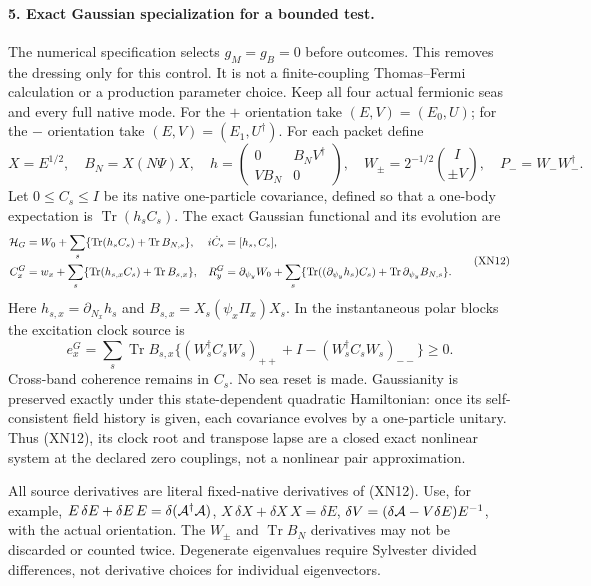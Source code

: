 \documentclass[11pt]{article}
\DeclareMathOperator{\Tr}{Tr}
\begin{document}
\paragraph{5. Exact Gaussian specialization for a bounded test.}
The numerical specification selects $g_M=g_B=0$ before outcomes.
This removes the dressing only for this control.  It is not a
finite-coupling Thomas--Fermi calculation or a production parameter
choice.  Keep all four actual fermionic seas and every full native
mode.  For the $+$ orientation take $(E,V)=(E_0,U)$; for the $-$
orientation take $(E,V)=(E_1,U^\dagger)$.  For each packet define
\begin{equation}
 X=E^{1/2},\quad B_N=X(N\Psi)X,\quad
 h=\begin{pmatrix}0&B_NV^\dagger\\VB_N&0\end{pmatrix},\quad
 W_\pm=2^{-1/2}\binom{I}{\pm V},\quad P_-=W_-W_-^\dagger .
 \tag{XN11}
\end{equation}
Let $0\leq C_s\leq I$ be its native one-particle covariance, defined
so that a one-body expectation is $\Tr(h_sC_s)$.
The exact Gaussian functional and its evolution are
\begin{equation}
 \begin{aligned}
 {\cal H}_G&=W_0+\sum_s\{\Tr(h_s C_s)+\Tr B_{N,s}\},&
 i\dot C_s&=[h_s,C_s],\\
 C_x^{G}&=w_x+\sum_s\{\Tr(h_{s,x}C_s)+\Tr B_{s,x}\},&
 R_y^{G}&=\partial_{\psi_y}W_0+
       \sum_s\{\Tr((\partial_{\psi_y}h_s)C_s)
                              +\Tr\partial_{\psi_y}B_{N,s}\}.
 \end{aligned}\tag{XN12}
\end{equation}
Here $h_{s,x}=\partial_{N_x}h_s$ and
$B_{s,x}=X_s(\psi_x\Pi_x)X_s$.
In the instantaneous polar blocks the excitation clock source is
\[
 e_x^G=\sum_s\Tr B_{s,x}
      \{(W_s^\dagger C_s W_s)_{++}
                     +I-(W_s^\dagger C_s W_s)_{--}\}\geq0 .
\]
Cross-band coherence remains in $C_s$.  No sea reset is made.
Gaussianity is preserved exactly under this state-dependent
quadratic Hamiltonian: once its self-consistent field history is
given, each covariance evolves by a one-particle unitary.  Thus
(XN12), its clock root and transpose lapse are a closed exact
nonlinear system at the declared zero couplings, not a nonlinear
pair approximation.

All source derivatives are literal fixed-native derivatives of
(XN12).  Use, for example,
$E\,\delta E+\delta E\,E=\delta({\cal A}^\dagger{\cal A})$,
$X\,\delta X+\delta X\,X=\delta E$,
$\delta V=(\delta{\cal A}-V\delta E)E^{-1}$, with the actual
orientation.  The $W_\pm$ and $\Tr B_N$ derivatives may not be
discarded or counted twice.  Degenerate eigenvalues require
Sylvester divided differences, not derivative choices for
individual eigenvectors.
\end{document}
